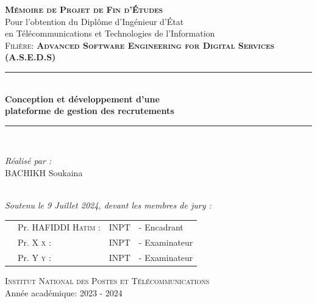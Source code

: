 \begin{titlepage}
\centering
{\LARGE \textsc{\textbf{Mémoire de Projet de Fin d’Études }}}\\[0.3cm]
{\large Pour l’obtention du Diplôme d’Ingénieur d’État\\ en Télécommunications et Technologies de l’Information }\\[0.3cm]
{\large \textsc{Filière: \textbf{Advanced Software Engineering for Digital Services (A.S.E.D.S)} }}\\[0.1cm]
\vspace{0.2cm}

\rule{\linewidth}{0.4mm} \\[0.6cm] %
{ \huge \textbf{Conception et développement d'une }\\[0.2cm]\textbf{plateforme de gestion des recrutements
 }} \\[0.8cm]
\rule{\linewidth}{0.4mm} \\[0.4cm]
\vspace{0.6cm}
\noindent
\begin{minipage}{0.9\textwidth}
    \vspace{-7mm}
  \begin{flushleft} \large
    \emph{Réalisé par :} \\
     \textsc{BACHIKH} Soukaina  \\
    
  \end{flushleft}
\end{minipage}

\begin{minipage}{0.4\textwidth}
\end{minipage}\\[0.2cm]
{\large \textit{Soutenu le 9 Juillet 2024, devant les membres de jury : }}\\[0.5cm]
\centering

\begin{tabular}{p{2.8cm}lll}
 & \large Pr. HAFIDDI \textsc{Hatim} : & \large INPT & \large - Encadrant \\[0.1cm]
 & \large Pr. X \textsc{x} : & \large INPT & \large - Examinateur \\[0.1cm]
 
 & \large Pr. Y \textsc{y} : & \large INPT & \large - Examinateur  \\[0.1cm]

\end{tabular}




\vspace{6.5cm}
\textsc{Institut National des Postes et Télécommunications}\\

\vspace{0.2cm}
{\large Année académique: 2023 - 2024}

\end{titlepage}